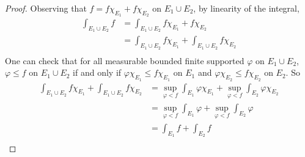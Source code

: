 \documentclass[lang=en, 12pt]{elegantbook}
\begin{document}
            \begin{proof}
                Observing that $f = f\chi_{E_1} +f\chi_{E_2}$ on $E_1 \cup E_2$, by linearity of the integral, 
                \begin{equation*}
                    \begin{aligned}
                        \int_{E_1\cup E_2} f &= \int_{E_1\cup E_2} f\chi_{E_1} +f\chi_{E_2}\\
                        &= \int_{E_1\cup E_2} f\chi_{E_1} + \int_{E_1\cup E_2} f\chi_{E_2}\\
                    \end{aligned}
                \end{equation*}
                One can check that for all measurable bounded finite supported $\varphi $ on $E_1 \cup E_2$, $\varphi \leq f$ on $E_1 
            \cup E_2$ if and only if $\varphi \chi_{E_1} \leq f \chi_{E_1}$ on $E_1$ and $\varphi \chi_{E_2} \leq f \chi_{E_2}$ on $E_2$. So
            \begin{equation*}
                \begin{aligned}
                    \int_{E_1\cup E_2} f\chi_{E_1} + \int_{E_1\cup E_2} f\chi_{E_2} &= \sup_{\varphi<f} \int_{E_1} \varphi \chi_{E_1} +\sup_{\varphi<f} \int_{E_2} \varphi \chi_{E_2}\\
                    &= \sup_{\varphi<f} \int_{E_1} \varphi +\sup_{\varphi<f} \int_{E_2} \varphi \\
                    &= \int_{E_1} f + \int_{E_2} f \\
                \end{aligned}
            \end{equation*}
            \end{proof}
            
\end{document}

